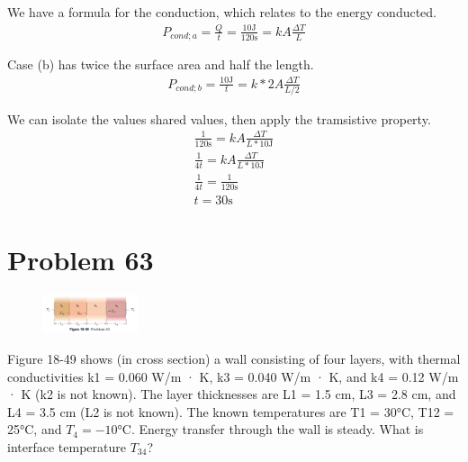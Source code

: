 \documentclass[12pt]{article}
\begin{document}
            We have a formula for the conduction, which relates to the energy conducted.
            \begin{gather}
                P_{cond;a}    =   \frac{Q}{t}
                    =   \frac{10 \unit{\joule}}{120 \unit{\second}}
                    =   kA\frac{\Delta T}{L}
            \end{gather}

            Case (b) has twice the surface area and half the length.
            \begin{gather}
                P_{cond;b}  =   \frac{10 \unit{\joule}}{t}
                    =   k*2A\frac{\Delta T}{L/2}
            \end{gather}

            We can isolate the values shared values, then apply the tramsistive property.
            \begin{gather}
                \frac{1}{120 \unit{\second}}    =   kA\frac{\Delta T}{L * 10 \unit{\joule}}\\
                \frac{1}{4t}    =   kA\frac{\Delta T}{L * 10 \unit{\joule}}\\
                \frac{1}{4t}    =   \frac{1}{120 \unit{\second}}\\
                t   =   \boxed{30 \unit{\second}}
            \end{gather}


    \pagebreak
    \section{Problem 63}
        \begin{figure}
            \vspace{-30pt}
            \includegraphics[width=0.25\textwidth]{picture_18-49.png} 
        \end{figure}
        Figure 18-49 shows (in cross section) a wall consisting of four layers, with thermal conductivities k1 = 0.060 W/m · K, k3 = 0.040 W/m · K, and k4 = 0.12 W/m · K (k2 is not known). 
        The layer thicknesses are L1 = 1.5 cm, L3 = 2.8 cm, and L4 = 3.5 cm (L2 is not known). The known temperatures are T1 = 30°C, T12 = 25°C, and $T_4 = -10\unit{\celsius}$. 
        Energy transfer through the wall is steady. 
        What is interface temperature $T_{34}$?
\end{document}
